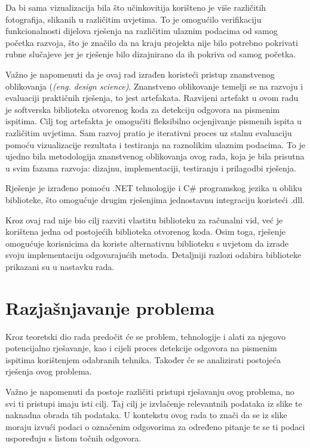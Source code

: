 \documentclass{foi}
\begin{document}
Da bi sama vizualizacija bila što učinkovitija korišteno je više različitih fotografija, slikanih u različitim uvjetima. To je omogućilo verifikaciju funkcionalnosti dijelova rješenja na različitim ulaznim podacima od samog početka razvoja, što je značilo da na kraju projekta nije bilo potrebno pokrivati rubne slučajeve jer je rješenje bilo dizajnirano da ih pokriva od samog početka.

Važno je napomenuti da je ovaj rad izrađen koristeći pristup znanstvenog oblikovanja (\textit{(eng. design science)}. Znanstveno oblikovanje temelji se na razvoju i evaluaciji praktičnih rješenja, to jest artefakata. Razvijeni artefakt u ovom radu je softverska biblioteka otvorenog koda za detekciju odgovora na pismenim ispitima. Cilj tog artefakta je omogućiti fleksibilno ocjenjivanje pismenih ispita u različitim uvjetima. Sam razvoj pratio je iterativni proces uz stalnu evaluaciju pomoću vizualizacije rezultata i testiranja na raznolikim ulaznim podacima. To je ujedno bila metodologija znanstvenog oblikovanja ovog rada, koja je bila prisutna u svim fazama razvoja: dizajnu, implementaciji, testiranju i prilagodbi rješenja.

Rješenje je izrađeno pomoću .NET tehnologije i C\# programskog jezika u obliku biblioteke, što omogućuje drugim rješenjima jednostavnu integraciju koristeći .dll. 

Kroz ovaj rad nije bio cilj razviti vlastitu biblioteku za računalni vid, već je korištena jedna od postojećih biblioteka otvorenog koda. Osim toga, rješenje omogućuje korisnicima da koriste alternativnu biblioteku s uvjetom da izrade svoju implementaciju odgovarajućih metoda. Detaljniji razlozi odabira biblioteke prikazani su u nastavku rada.


\chapter{Razjašnjavanje problema}

Kroz teoretski dio rada predočit će se problem, tehnologije i alati za njegovo potencijalno rješavanje, kao i cijeli proces detekcije odgovora na pismenim ispitima korištenjem odabranih tehnika. Također će se analizirati postojeća rješenja ovog problema.

Važno je napomenuti da postoje različiti pristupi rješavanju ovog problema, no svi ti pristupi imaju isti cilj. Taj cilj je izvlačenje relevantnih podataka iz slike te naknadna obrada tih podataka. U kontekstu ovog rada to znači da se iz slike moraju izvući podaci o označenim odgovorima za određeno pitanje te se ti podaci uspoređuju s listom točnih odgovora.
\end{document}
